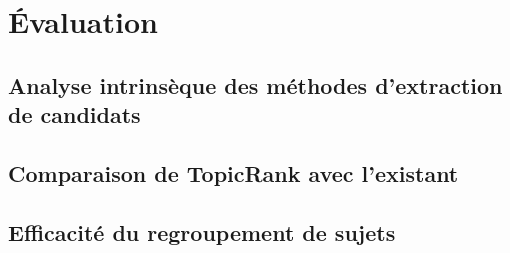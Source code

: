 \section{Évaluation}
\label{sec:evaluation}
  \subsection{Analyse intrinsèque des méthodes d'extraction de candidats}
  \label{subsec:analyse_intrinseque_des_methodes_d_extraction_de_candidats}

  \subsection{Comparaison de TopicRank avec l'existant}
  \label{subsec:comparaison_de_topicrank_avec_l_existant}

  \subsection{Efficacité du regroupement de sujets}
  \label{subsec:efficacite_du_regroupement_de_sujets}

